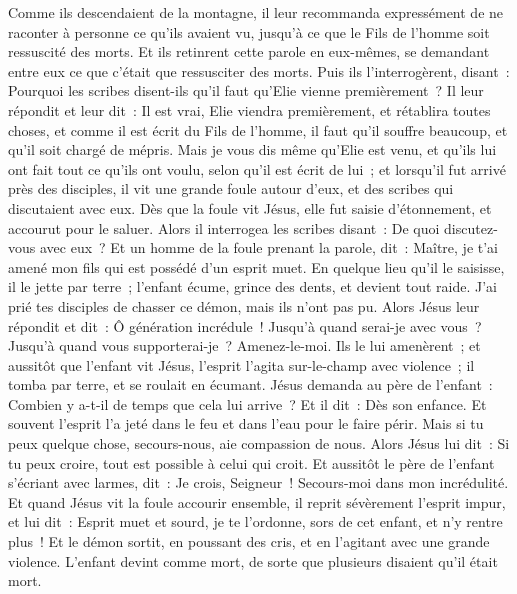 \begin{multicols}{2}
Comme ils descendaient de la montagne, il leur recommanda expressément de ne raconter à personne ce qu'ils avaient vu, jusqu'à ce que le Fils de l'homme soit ressuscité des morts.
Et ils retinrent cette parole en eux-mêmes, se demandant entre eux ce que c'était que ressusciter des morts.
Puis ils l'interrogèrent, disant~: Pourquoi les scribes disent-ils qu'il faut qu'Elie vienne premièrement~?
Il leur répondit et leur dit~: Il est vrai, Elie viendra premièrement, et rétablira toutes choses, et comme il est écrit du Fils de l'homme, il faut qu'il souffre beaucoup, et qu'il soit chargé de mépris.
Mais je vous dis même qu'Elie est venu, et qu'ils lui ont fait tout ce qu'ils ont voulu, selon qu'il est écrit de lui~;
et lorsqu'il fut arrivé près des disciples, il vit une grande foule autour d'eux, et des scribes qui discutaient avec eux.
Dès que la foule vit Jésus, elle fut saisie d'étonnement, et accourut pour le saluer.
Alors il interrogea les scribes disant~: De quoi discutez-vous avec eux~?
Et un homme de la foule prenant la parole, dit~: Maître, je t'ai amené mon fils qui est possédé d'un esprit muet.
En quelque lieu qu'il le saisisse, il le jette par terre~; l'enfant écume, grince des dents, et devient tout raide. J'ai prié tes disciples de chasser ce démon, mais ils n'ont pas pu.
Alors Jésus leur répondit et dit~: Ô génération incrédule~! Jusqu'à quand serai-je avec vous~? Jusqu'à quand vous supporterai-je~? Amenez-le-moi. Ils le lui amenèrent~;
et aussitôt que l'enfant vit Jésus, l'esprit l'agita sur-le-champ avec violence~; il tomba par terre, et se roulait en écumant.
Jésus demanda au père de l'enfant~: Combien y a-t-il de temps que cela lui arrive~? Et il dit~: Dès son enfance.
Et souvent l'esprit l'a jeté dans le feu et dans l'eau pour le faire périr. Mais si tu peux quelque chose, secours-nous, aie compassion de nous.
Alors Jésus lui dit~: Si tu peux croire, tout est possible à celui qui croit.
Et aussitôt le père de l'enfant s'écriant avec larmes, dit~: Je crois, Seigneur~! Secours-moi dans mon incrédulité.
Et quand Jésus vit la foule accourir ensemble, il reprit sévèrement l'esprit impur, et lui dit~: Esprit muet et sourd, je te l'ordonne, sors de cet enfant, et n'y rentre plus~!
Et le démon sortit, en poussant des cris, et en l'agitant avec une grande violence. L'enfant devint comme mort, de sorte que plusieurs disaient qu'il était mort.

\end{multicols}
